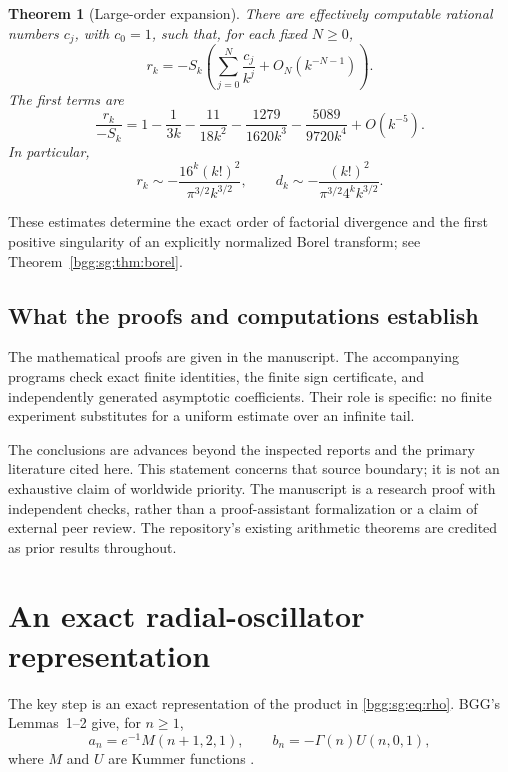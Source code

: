 \documentclass[11pt,a4paper]{article}
\numberwithin{equation}{section}
\newtheorem{theorem}{Theorem}[section]
\theoremstyle{definition}
\theoremstyle{remark}
\theoremstyle{definition}
\begin{document}
\begin{theorem}[Large-order expansion]\label{bgg:sg:thm:largeorder}
There are effectively computable rational numbers \(c_j\), with
\(c_0=1\), such that, for each fixed \(N\ge0\),
\[
 r_k=-S_k\left(\sum_{j=0}^{N}\frac{c_j}{k^j}
                       +O_N(k^{-N-1})\right).
\]
The first terms are
\begin{equation}\label{bgg:sg:eq:largeorder4}
 \frac{r_k}{-S_k}
 =1-\frac1{3k}-\frac{11}{18k^2}
   -\frac{1279}{1620k^3}-\frac{5089}{9720k^4}
   +O(k^{-5}).
\end{equation}
In particular,
\[
 r_k\sim-\frac{16^k(k!)^2}{\pi^{3/2}k^{3/2}},
 \qquad
 d_k\sim-\frac{(k!)^2}{\pi^{3/2}4^kk^{3/2}}.
\]
\end{theorem}

These estimates determine the exact order of factorial divergence and
the first positive singularity of an explicitly normalized Borel
transform; see Theorem~\ref{bgg:sg:thm:borel}.

\subsection{What the proofs and computations establish}
\label{bgg:sg:sec:establish}

The mathematical proofs are given in the manuscript.  The accompanying
programs check exact finite identities, the finite sign certificate,
and independently generated asymptotic coefficients.  Their role is
specific: no finite experiment substitutes for a uniform estimate over
an infinite tail.

The conclusions are advances beyond the inspected reports and the
primary literature cited here.  This statement concerns that source
boundary; it is not an exhaustive claim of worldwide priority.
The manuscript is a research proof with independent checks, rather
than a proof-assistant formalization or a claim of external peer review.
The repository's existing arithmetic theorems are credited as prior
results throughout.

\section{An exact radial-oscillator representation}\label{bgg:sg:sec:resolvent}

The key step is an exact representation of the product in
\eqref{bgg:sg:eq:rho}.  BGG's Lemmas~1--2 give, for \(n\ge1\),
\begin{equation}\label{bgg:sg:eq:kummercoeff}
 a_n=e^{-1}M(n+1,2,1),\qquad
 b_n=-\Gamma(n)U(n,0,1),
\end{equation}
where \(M\) and \(U\) are Kummer functions \cite{BGG,dlmf-kummer}.
\end{document}
